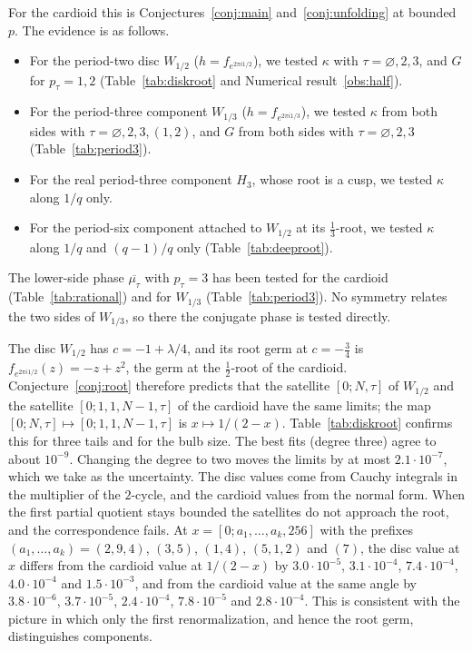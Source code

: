 \documentclass[11pt]{amsart}
\theoremstyle{definition}
\theoremstyle{remark}
\newcommand{\fa}[1]{f_{e^{2\pi i#1}}}
\begin{document}
For the cardioid this is Conjectures~\ref{conj:main} and~\ref{conj:unfolding} at bounded $p$. The evidence is as follows.
\begin{itemize}
\item For the period-two disc $W_{1/2}$ ($h=\fa{1/2}$), we tested $\kappa$ with $\tau=\varnothing,2,3$, and $G$ for $p_\tau=1,2$ (Table~\ref{tab:diskroot} and Numerical result~\ref{obs:half}).
\item For the period-three component $W_{1/3}$ ($h=\fa{1/3}$), we tested $\kappa$ from both sides with $\tau=\varnothing,2,3,(1,2)$, and $G$ from both sides with $\tau=\varnothing,2,3$ (Table~\ref{tab:period3}).
\item For the real period-three component $H_3$, whose root is a cusp, we tested $\kappa$ along $1/q$ only.
\item For the period-six component attached to $W_{1/2}$ at its $\frac13$-root, we tested $\kappa$ along $1/q$ and $(q-1)/q$ only (Table~\ref{tab:deeproot}).
\end{itemize}
The lower-side phase $\overline{\mu_\tau}$ with $p_\tau=3$ has been tested for the cardioid (Table~\ref{tab:rational}) and for $W_{1/3}$ (Table~\ref{tab:period3}). No symmetry relates the two sides of $W_{1/3}$, so there the conjugate phase is tested directly.

The disc $W_{1/2}$ has $c=-1+\lambda/4$, and its root germ at $c=-\frac34$ is $\fa{1/2}(z)=-z+z^2$, the germ at the $\frac12$-root of the cardioid. Conjecture~\ref{conj:root} therefore predicts that the satellite $[0;N,\tau]$ of $W_{1/2}$ and the satellite $[0;1,1,N-1,\tau]$ of the cardioid have the same limits; the map $[0;N,\tau]\mapsto[0;1,1,N-1,\tau]$ is $x\mapsto1/(2-x)$. Table~\ref{tab:diskroot} confirms this for three tails and for the bulb size. The best fits (degree three) agree to about $10^{-9}$. Changing the degree to two moves the limits by at most $2.1\cdot10^{-7}$, which we take as the uncertainty. The disc values come from Cauchy integrals in the multiplier of the $2$-cycle, and the cardioid values from the normal form. When the first partial quotient stays bounded the satellites do not approach the root, and the correspondence fails. At $x=[0;a_1,\ldots,a_k,256]$ with the prefixes $(a_1,\ldots,a_k)=(2,9,4)$, $(3,5)$, $(1,4)$, $(5,1,2)$ and $(7)$, the disc value at $x$ differs from the cardioid value at $1/(2-x)$ by $3.0\cdot10^{-5}$, $3.1\cdot10^{-4}$, $7.4\cdot10^{-4}$, $4.0\cdot10^{-4}$ and $1.5\cdot10^{-3}$, and from the cardioid value at the same angle by $3.8\cdot10^{-6}$, $3.7\cdot10^{-5}$, $2.4\cdot10^{-4}$, $7.8\cdot10^{-5}$ and $2.8\cdot10^{-4}$. This is consistent with the picture in which only the first renormalization, and hence the root germ, distinguishes components.
\end{document}
